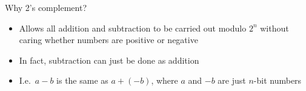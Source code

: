 \begin{frame}{Why 2's complement?}
    \begin{itemize}
        \pause\item Allows all addition and subtraction to be carried out modulo $2^n$
            without caring whether numbers are positive or negative
        \pause\item In fact, subtraction can just be done as addition
        \pause\item I.e.\ $a-b$ is the same as $a+(-b)$, where $a$ and $-b$ are just $n$-bit numbers
    \end{itemize}
\end{frame}
